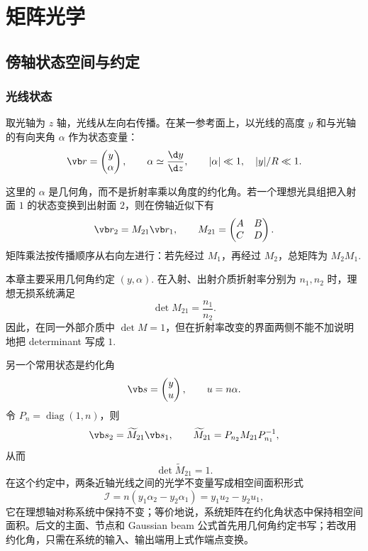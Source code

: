 \section{矩阵光学}

\subsection{傍轴状态空间与约定}

\subsubsection{光线状态}

取光轴为 \(z\) 轴，光线从左向右传播。在某一参考面上，以光线的高度 \(y\) 和与光轴的有向夹角 \(\alpha\) 作为状态变量：
\begin{equation}
	\vb r=
	\begin{pmatrix}
		y\\ \alpha
	\end{pmatrix},
	\qquad
	\alpha\simeq \frac{\d y}{\d z},
	\qquad
	|\alpha|\ll 1,\quad |y|/R\ll 1.
\end{equation}

这里的 \(\alpha\) 是几何角，而不是折射率乘以角度的约化角。若一个理想光具组把入射面 \(1\) 的状态变换到出射面 \(2\)，则在傍轴近似下有
\begin{equation}
	\vb r_2=M_{21}\vb r_1,\qquad
	M_{21}=
	\begin{pmatrix}
		A&B\\ C&D
	\end{pmatrix}.
\end{equation}
矩阵乘法按传播顺序从右向左进行：若先经过 \(M_1\)，再经过 \(M_2\)，总矩阵为 \(M_2M_1\).

本章主要采用几何角约定 \((y,\alpha)\). 在入射、出射介质折射率分别为 \(n_1,n_2\) 时，理想无损系统满足
\begin{equation}
	\det M_{21}=\frac{n_1}{n_2}.
\end{equation}
因此，在同一外部介质中 \(\det M=1\)，但在折射率改变的界面两侧不能不加说明地把 determinant 写成 \(1\).

另一个常用状态是约化角
\begin{equation}
	\vb s=
	\begin{pmatrix}
		y\\ u
	\end{pmatrix},
	\qquad u=n\alpha.
\end{equation}
令 \(P_n=\operatorname{diag}(1,n)\)，则
\begin{equation}
	\vb s_2=\widetilde M_{21}\vb s_1,\qquad
	\widetilde M_{21}=P_{n_2}M_{21}P_{n_1}^{-1},
\end{equation}
从而
\begin{equation}
	\det\widetilde M_{21}=1.
\end{equation}
	在这个约定中，两条近轴光线之间的光学不变量写成相空间面积形式
\begin{equation}
	\mathcal I
	=n\left(y_1\alpha_2-y_2\alpha_1\right)
	=y_1u_2-y_2u_1,
\end{equation}
	它在理想轴对称系统中保持不变；等价地说，系统矩阵在约化角状态中保持相空间面积。后文的主面、节点和 Gaussian beam 公式首先用几何角约定书写；若改用约化角，只需在系统的输入、输出端用上式作端点变换。

